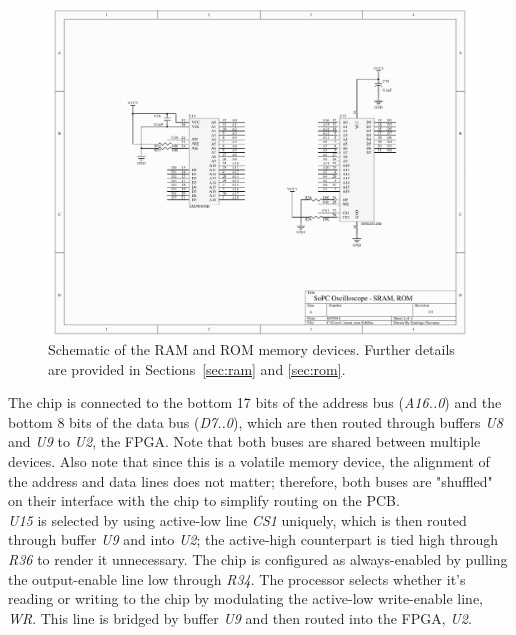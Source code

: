 \documentclass[titlepage]{scrartcl}
\begin{document}
	\begin{figure}[h!]
	\vspace{-2cm}
	\centerline{\includegraphics[width=26cm, angle=90, origin=c]{img/sram_rom.pdf}}
                	\caption{Schematic of the RAM and ROM memory devices. Further details are provided in Sections~\ref{sec:ram} and \ref{sec:rom}.}
               	\label{fig:ram_rom}
	\end{figure}

	The chip is connected to the bottom 17 bits of the address bus (\textit{A16..0}) and the bottom 8 bits of the data bus (\textit{D7..0}), which are then routed through buffers \textit{U8} and \textit{U9} to \textit{U2}, the FPGA. Note that both buses are shared between multiple devices. Also note that since this is a volatile memory device, the alignment of the address and data lines does not matter; therefore, both buses are "shuffled" on their interface with the chip to simplify routing on the PCB.\\

	\textit{U15} is selected by using active-low line \textit{CS1} uniquely, which is then routed through buffer \textit{U9} and into \textit{U2}; the active-high counterpart is tied high through \textit{R36} to render it unnecessary. The chip is configured as always-enabled by pulling the output-enable line low through \textit{R34}. The processor selects whether it's reading or writing to the chip by modulating the active-low write-enable line, \textit{WR}. This line is bridged by buffer \textit{U9} and then routed into the FPGA, \textit{U2}.\\
\end{document}
